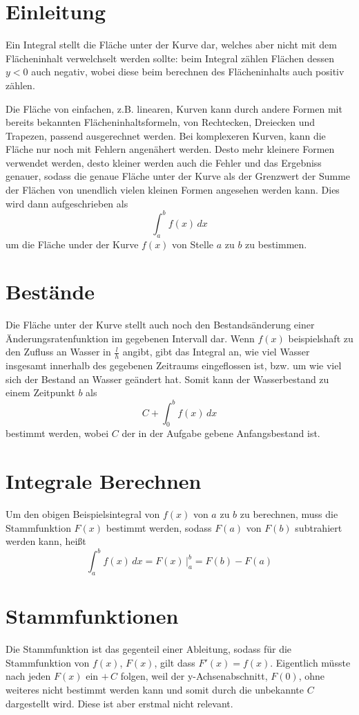 \documentclass{article}
\begin{document}
 
\section{Einleitung}
Ein Integral stellt die Fläche unter der Kurve dar, welches aber nicht mit dem Flächeninhalt verwelchselt werden sollte: beim Integral zählen Flächen dessen $y<0$ auch negativ, wobei diese beim berechnen des Flächeninhalts auch positiv zählen.
 
Die Fläche von einfachen, z.B. linearen, Kurven kann durch andere Formen mit bereits bekannten Flächeninhaltsformeln, von Rechtecken, Dreiecken und Trapezen, passend ausgerechnet werden. Bei komplexeren Kurven, kann die Fläche nur noch mit Fehlern angenähert werden. Desto mehr kleinere Formen verwendet werden, desto kleiner werden auch die Fehler und das Ergebniss genauer, sodass die genaue Fläche unter der Kurve als der Grenzwert der Summe der Flächen von unendlich vielen kleinen Formen angesehen werden kann. \newline
Dies wird dann aufgeschrieben als
\[\int_a^b f(x) \,dx\] 
um die Fläche under der Kurve $f(x)$ von Stelle $a$ zu $b$ zu bestimmen.
 
\section{Bestände} 
Die Fläche unter der Kurve stellt auch noch den Bestandsänderung einer Änderungsratenfunktion im gegebenen Intervall dar. \newline
Wenn $f(x)$ beispielshaft zu den Zufluss an Wasser in $\frac{l}{h}$ angibt, gibt das Integral an, wie viel Wasser insgesamt innerhalb des gegebenen Zeitraums eingeflossen ist, bzw. um wie viel sich der Bestand an Wasser geändert hat. Somit kann der Wasserbestand zu einem Zeitpunkt $b$ als
\[C + \int_0^b f(x) \, dx\]
bestimmt werden, wobei $C$ der in der Aufgabe gebene Anfangsbestand ist.
 
\section{Integrale Berechnen}
Um den obigen Beispielsintegral von $f(x)$ von $a$ zu $b$ zu berechnen, muss die Stammfunktion $F(x)$ bestimmt werden, sodass $F(a)$ von $F(b)$ subtrahiert werden kann, heißt
\[\int_a^b f(x) \,dx =
F(x) \,\Bigr|_a^b =
F(b) - F(a)\]
 
\section{Stammfunktionen}
Die Stammfunktion ist das gegenteil einer Ableitung, sodass für die Stammfunktion von $f(x)$, $F(x)$, gilt dass $F'(x)=f(x)$. \newline
Eigentlich müsste nach jeden $F(x)$ ein $+ \, C$ folgen, weil der y-Achsenabschnitt, $F(0)$, ohne weiteres nicht bestimmt werden kann und somit durch die unbekannte $C$ dargestellt wird. Diese ist aber erstmal nicht relevant. 
 
\end{document}
